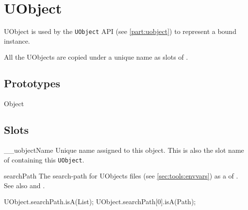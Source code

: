 
\section{UObject}

UObject is used by the \lstinline|UObject| API (see
\autoref{part:uobject}) to represent a bound \Cxx instance.

All the UObjects are copied under a unique name as slots of
.

\subsection{Prototypes}
\begin{refObjects}
\item[Object]
\end{refObjects}

\subsection{Slots}

\begin{urbiscriptapi}
\item[__uobjectName]%
  Unique name assigned to this object. This is also the slot name of
   containing this \lstinline|UObject|.

\item[searchPath] The search-path for UObjects files (see
  \autoref{sec:tools:envvars}) as a  of .
  See also  and .
\begin{urbiassert}
UObject.searchPath.isA(List);
UObject.searchPath[0].isA(Path);
\end{urbiassert}
\end{urbiscriptapi}

